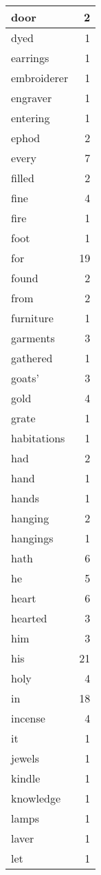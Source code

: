 \begin{center}
\begin{longtable}{l|r}
door & 2 \\ \hline
dyed & 1 \\ \hline
earrings & 1 \\ \hline
embroiderer & 1 \\ \hline
engraver & 1 \\ \hline
entering & 1 \\ \hline
ephod & 2 \\ \hline
every & 7 \\ \hline
filled & 2 \\ \hline
fine & 4 \\ \hline
fire & 1 \\ \hline
foot & 1 \\ \hline
for & 19 \\ \hline
found & 2 \\ \hline
from & 2 \\ \hline
furniture & 1 \\ \hline
garments & 3 \\ \hline
gathered & 1 \\ \hline
goats' & 3 \\ \hline
gold & 4 \\ \hline
grate & 1 \\ \hline
habitations & 1 \\ \hline
had & 2 \\ \hline
hand & 1 \\ \hline
hands & 1 \\ \hline
hanging & 2 \\ \hline
hangings & 1 \\ \hline
hath & 6 \\ \hline
he & 5 \\ \hline
heart & 6 \\ \hline
hearted & 3 \\ \hline
him & 3 \\ \hline
his & 21 \\ \hline
holy & 4 \\ \hline
in & 18 \\ \hline
incense & 4 \\ \hline
it & 1 \\ \hline
jewels & 1 \\ \hline
kindle & 1 \\ \hline
knowledge & 1 \\ \hline
lamps & 1 \\ \hline
laver & 1 \\ \hline
let & 1 \\ \hline

\end{longtable}
\end{center}
